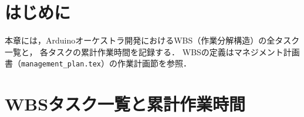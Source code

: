 
\section{はじめに}
本章には，Arduinoオーケストラ開発におけるWBS（作業分解構造）の全タスク一覧と，
各タスクの累計作業時間を記録する．
WBSの定義はマネジメント計画書（\texttt{management\_plan.tex}）の作業計画節を参照．

\section{WBSタスク一覧と累計作業時間}

